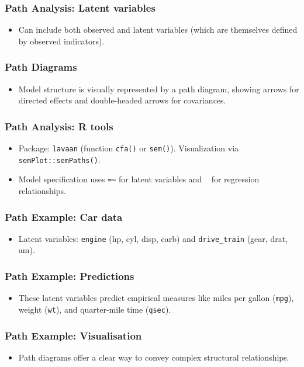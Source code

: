 \documentclass{beamer}
\newcommand{\code}[1]{\texttt{#1}}
\begin{document}
\begin{frame}
    \frametitle{Path Analysis: Latent variables}
    \begin{itemize}
        \item Can include both observed and \alert{latent variables} (which are themselves defined by observed indicators).
    \end{itemize}
\end{frame}

\begin{frame}
    \frametitle{Path Diagrams}
    \begin{itemize}
        \item Model structure is visually represented by a \alert{path diagram}, showing arrows for directed effects and double-headed arrows for covariances.
    \end{itemize}
\end{frame}

\begin{frame}
    \frametitle{Path Analysis: R tools}
    \begin{itemize}
        \item Package: \code{lavaan} (function \code{cfa()} or \code{sem()}). Visualization via \code{semPlot::semPaths()}.
        \item Model specification uses \texttt{=\~} for latent variables and \texttt{~} for regression relationships.
    \end{itemize}
\end{frame}

\begin{frame}
    \frametitle{Path Example: Car data}
    \begin{itemize}
        \item Latent variables: \texttt{engine} (hp, cyl, disp, carb) and \texttt{drive\_train} (gear, drat, am).
    \end{itemize}
\end{frame}

\begin{frame}
    \frametitle{Path Example: Predictions}
    \begin{itemize}
        \item These latent variables predict empirical measures like miles per gallon (\texttt{mpg}), weight (\texttt{wt}), and quarter-mile time (\texttt{qsec}).
    \end{itemize}
\end{frame}

\begin{frame}
    \frametitle{Path Example: Visualisation}
    \begin{itemize}
        \item Path diagrams offer a clear way to convey complex structural relationships.
    \end{itemize}
\end{frame}
\end{document}
